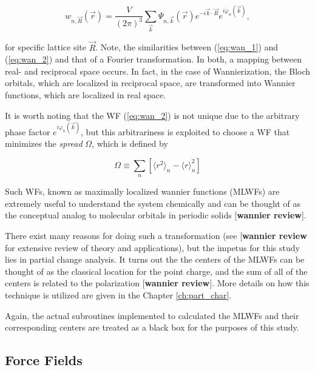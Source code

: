     \begin{equation}
    \label{eq:wan_2}
        w_{n,\vec{R}}(\Vec{r}) = \frac{V}{(2\pi)^3} \sum\limits_{\Vec{k}}  \Psi_{n,\vec{k}}(\Vec{r}) e^{-i\Vec{k}\cdot\Vec{R}} e^{i\varphi_n(\vec{k})},
    \end{equation}
    
    \noindent for specific lattice site $\vec{R}$. Note, the similarities between (\ref{eq:wan_1}) and (\ref{eq:wan_2}) and that of a Fourier transformation. In both, a mapping between real- and reciprocal space occurs. In fact, in the case of Wannierization, the Bloch orbitals, which are localized in reciprocal space, are transformed into Wannier functions, which are localized in real space.
    
    It is worth noting that the WF (\ref{eq:wan_2}) is not unique due to the arbitrary phase factor $e^{i\varphi_n(\vec{k})}$, but this arbitrariness is exploited to choose a WF that minimizes the \textit{spread} $\Omega$, which is defined by
    
    \begin{equation}
        \Omega \equiv \sum\limits_n \left[ \langle r^2 \rangle_n - \langle r \rangle^2_n \right]
    \end{equation}
    
    \noindent Such WFs, known as maximally localized wannier functions (MLWFs) are extremely useful to understand the system chemically and can be thought of as the conceptual analog to molecular orbitals in periodic solids [\textbf{wannier review}].
    
    
    There exist many reasons for doing such a transformation (see [\textbf{wannier review} for extensive review of theory and applications), but the impetus for this study lies in partial change analysis. It turns out the the centers of the MLWFs can be thought of as the classical location for the point charge, and the sum of all of the centers is related to the polarization [\textbf{wannier review}]. More details on how this technique is utilized are given in the Chapter \ref{ch:part_char}.
    
    Again, the actual subroutines implemented to calculated the MLWFs and their corresponding centers are treated as a black box for the purposes of this study.
    
    \subsection{Force Fields}
    
